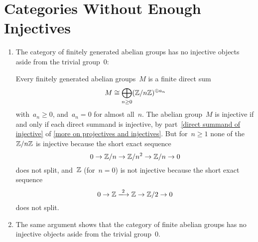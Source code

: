 \section{Categories Without Enough Injectives}


\begin{example}
  \leavevmode
  \begin{enumerate}
    \item
      The category of finitely generated abelian groups has no injective objects aside from the trivial group~$0$:
      
      Every finitely generated abelian groups~$M$ is a finite direct sum
      \[
        M
        \cong
        \bigoplus_{n \geq 0}
        (\mathbb{Z}/n\mathbb{Z})^{\oplus a_n}
      \]
      with~$a_n \geq 0$, and~$a_n = 0$ for almost all~$n$.
      The abelian group~$M$ is injective if and only if each direct summand is injective, by part~\ref*{direct summand of injective} of \cref{more on projectives and injectives}.
      But for~$n \geq 1$ none of the~$\mathbb{Z}/n\mathbb{Z}$ is injective because the short exact sequence
      \[
        0
        \to
        \mathbb{Z}/n
        \to
        \mathbb{Z}/n^2
        \to
        \mathbb{Z}/n
        \to
        0
      \]
      does not split, and~$\mathbb{Z}$ (for~$n = 0$) is not injective because the short exact sequence
      \[
        0
        \to
        \Integer
        \xlongto{2}
        \Integer
        \to
        \Integer/2
        \to
        0
      \]
      does not split.
    \item
      The same argument shows that the category of finite abelian groups has no injective objects aside from the trivial group~$0$.
  \end{enumerate}
\end{example}




